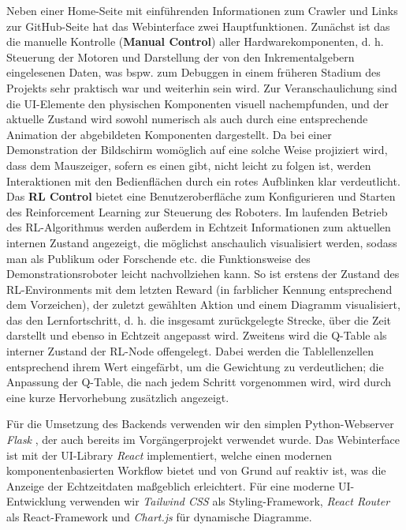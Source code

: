 Neben einer Home-Seite mit einführenden Informationen zum Crawler und Links zur GitHub-Seite hat das Webinterface zwei Hauptfunktionen. Zunächst ist das die manuelle Kontrolle (\textbf{Manual Control}) aller Hardwarekomponenten, d. h. Steuerung der Motoren und Darstellung der von den Inkrementalgebern eingelesenen Daten, was bspw. zum Debuggen in einem früheren Stadium des Projekts sehr praktisch war und weiterhin sein wird. Zur Veranschaulichung sind die UI-Elemente den physischen Komponenten visuell nachempfunden, und der aktuelle Zustand wird sowohl numerisch als auch durch eine entsprechende Animation der abgebildeten Komponenten dargestellt. Da bei einer Demonstration der Bildschirm womöglich auf eine solche Weise projiziert wird, dass dem Mauszeiger, sofern es einen gibt, nicht leicht zu folgen ist, werden Interaktionen mit den Bedienflächen durch ein rotes Aufblinken klar verdeutlicht. Das \textbf{RL Control} bietet eine Benutzeroberfläche zum Konfigurieren und Starten des Reinforcement Learning zur Steuerung des Roboters. Im laufenden Betrieb des RL-Algorithmus werden außerdem in Echtzeit Informationen zum aktuellen internen Zustand angezeigt, die möglichst anschaulich visualisiert werden, sodass man als Publikum oder Forschende etc. die Funktionsweise des Demonstrationsroboter leicht nachvollziehen kann. So ist erstens der Zustand des RL-Environments mit dem letzten Reward (in farblicher Kennung entsprechend dem Vorzeichen), der zuletzt gewählten Aktion und einem Diagramm visualisiert, das den Lernfortschritt, d. h. die insgesamt zurückgelegte Strecke, über die Zeit darstellt und ebenso in Echtzeit angepasst wird. Zweitens wird die Q-Table als interner Zustand der RL-Node offengelegt. Dabei werden die Tablellenzellen entsprechend ihrem Wert eingefärbt, um die Gewichtung zu verdeutlichen; die Anpassung der Q-Table, die nach jedem Schritt vorgenommen wird, wird durch eine kurze Hervorhebung zusätzlich angezeigt. 

Für die Umsetzung des Backends verwenden wir den simplen Python-Webserver \emph{Flask} \cite{flask}, der auch bereits im Vorgängerprojekt verwendet wurde. Das Webinterface ist mit der UI-Library \emph{React} \cite{react} implementiert, welche einen modernen komponentenbasierten Workflow bietet und von Grund auf reaktiv ist, was die Anzeige der Echtzeitdaten maßgeblich erleichtert. Für eine moderne UI-Entwicklung verwenden wir \emph{Tailwind CSS} \cite{tailwindcss} als Styling-Framework, \emph{React Router} \cite{reactrouter} als React-Framework und \emph{Chart.js} \cite{chartjs} für dynamische Diagramme.

